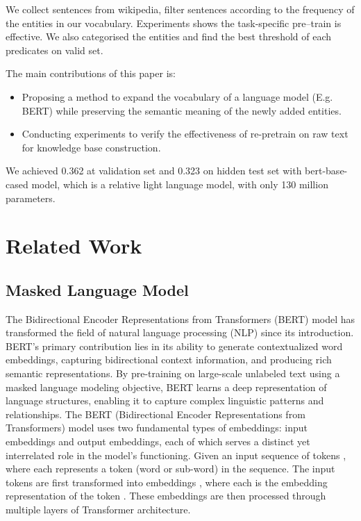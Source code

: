 \documentclass[]{ceurart}
\begin{document}
We collect sentences from wikipedia, filter sentences according to the frequency of the entities in our vocabulary.  Experiments shows the task-specific pre--train is effective.  We also categorised the entities and find the best threshold of each predicates on valid set. 


The main contributions of this paper is:
\begin{itemize}  
\item Proposing a method to expand the vocabulary of a language model (E.g. BERT)  while preserving the semantic meaning of the newly added entities. 
\item Conducting experiments to verify the effectiveness of re-pretrain on raw text for knowledge base construction.
 \end{itemize}

We achieved 0.362 at validation set and 0.323 on hidden test set with bert-base-cased model, which is a relative light language model,  with only 130 million parameters.

\section{Related Work}

\subsection{Masked Language Model}
The Bidirectional Encoder Representations from Transformers (BERT) \cite{devlin_bert_2019} model has transformed the field of natural language processing (NLP) since its introduction. BERT's primary contribution lies in its ability to generate contextualized word embeddings, capturing bidirectional context information, and producing rich semantic representations. By pre-training on large-scale unlabeled text using a masked language modeling objective, BERT learns a deep representation of language structures, enabling it to capture complex linguistic patterns and relationships.  The BERT (Bidirectional Encoder Representations from Transformers) \cite{devlin_bert_2019} model uses two fundamental types of embeddings: input embeddings and output embeddings, each of which serves a distinct yet interrelated role in the model's functioning.  Given an input sequence of tokens , where each  represents a token (word or sub-word) in the sequence. The input tokens are first transformed into embeddings , where each  is the embedding representation of the token . These embeddings are then processed through multiple layers of Transformer architecture.
\end{document}
